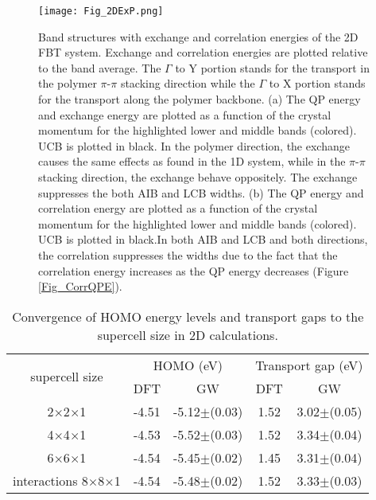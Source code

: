 \documentclass[journal = jpclcd]{achemso}
\begin{document}
\begin{figure}[H]
    \centering
    \texttt{[image: Fig\_2DExP.png]}
    \caption{Band structures with exchange and correlation energies of the 2D FBT system. Exchange and correlation energies are plotted relative to the band average. The $\Gamma$ to Y portion stands for the transport in the polymer $\pi$-$\pi$ stacking direction while the $\Gamma$ to X portion stands for the transport along the polymer backbone. (a) The QP energy and exchange energy are plotted  as a function of the crystal momentum for the highlighted lower and middle bands (colored). UCB is plotted in black. In the polymer direction, the exchange causes the same effects as found in the 1D system, while in the $\pi$-$\pi$ stacking direction, the exchange behave oppositely. The exchange suppresses the both AIB and LCB widths. (b) The QP energy and correlation energy are plotted  as a function of the crystal momentum for the highlighted lower and middle bands (colored).  UCB is plotted in black.In both AIB and LCB and both directions, the correlation suppresses the widths due to the fact that the correlation energy increases as the QP energy decreases (Figure \ref{Fig_CorrQPE}).} 
    \label{Fig_2DExP}
\end{figure}



 \begin{table}[H]
     \centering
     \begin{tabular}{c|c|c|c|c}
 \multirow{2}{*}{supercell size} & \multicolumn{2}{c|}{HOMO {(}eV{)}} & \multicolumn{2}{c}{Transport gap {(}eV{)}} \\ \cline{2-5} 
                                 & DFT          & GW                  & DFT              & GW                      \\ \hline
 2$\times$2$\times$1                           & -4.51        & -5.12$\pm$(0.03)        & 1.52             & 3.02$\pm$(0.05)             \\
 4$\times$4$\times$1                           & -4.53        & -5.52$\pm$(0.03)        & 1.52             & 3.34$\pm$(0.04)             \\
 6$\times$6$\times$1                           & -4.54        & -5.45$\pm$(0.02)        & 1.45             & 3.31$\pm$(0.04)             \\interactions
 8$\times$8$\times$1                           & -4.54        & -5.48$\pm$(0.02)        & 1.52             & 3.33$\pm$(0.03)            
 \end{tabular}
     \caption{Convergence of HOMO energy levels and transport gaps to the  supercell size in 2D calculations.}
     \label{tab:convergence_to_supercell}
 \end{table}



\end{document}
